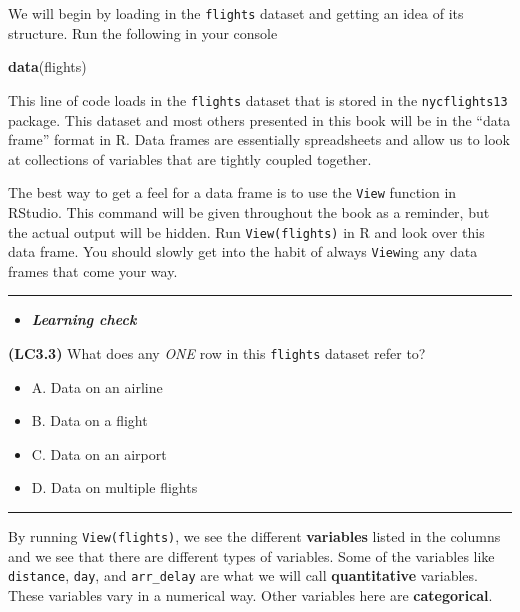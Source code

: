 \documentclass[]{tufte-book}
\newenvironment{Shaded}{\begin{snugshade}}{\end{snugshade}}
\newcommand{\KeywordTok}[1]{\textcolor[rgb]{0.13,0.29,0.53}{\textbf{{#1}}}}
\newcommand{\NormalTok}[1]{{#1}}
\let\oldrule=\rule
\renewcommand{\rule}[1]{\oldrule{\linewidth}}
\providecommand{\tightlist}{%
  \setlength{\itemsep}{0pt}\setlength{\parskip}{0pt}}
\newenvironment{rmdblock}[1]
  {\begin{shaded*}
  \begin{itemize}
  \renewcommand{\labelitemi}{
    \raisebox{-.7\height}[0pt][0pt]{
    }
  }
  \item
  }
  {
  \end{itemize}
  \end{shaded*}
  }
\newenvironment{learncheck}
  {\begin{rmdblock}{warning}}
  {\end{rmdblock}}
\begin{document}
We will begin by loading in the \texttt{flights} dataset and getting an
idea of its structure. Run the following in your console

\begin{Shaded}
\begin{Highlighting}[]
\KeywordTok{data}\NormalTok{(flights)}
\end{Highlighting}
\end{Shaded}

This line of code loads in the \texttt{flights} dataset that is stored
in the \texttt{nycflights13} package. This dataset and most others
presented in this book will be in the ``data frame'' format in R. Data
frames are essentially spreadsheets and allow us to look at collections
of variables that are tightly coupled together.

The best way to get a feel for a data frame is to use the \texttt{View}
function in RStudio. This command will be given throughout the book as a
reminder, but the actual output will be hidden. Run
\texttt{View(flights)} in R and look over this data frame. You should
slowly get into the habit of always \texttt{View}ing any data frames
that come your way.

\begin{center}\rule{0.5\linewidth}{\linethickness}\end{center}

\begin{learncheck}
\textbf{\emph{Learning check}}
\end{learncheck}

\textbf{(LC3.3)} What does any \emph{ONE} row in this \texttt{flights}
dataset refer to?

\begin{itemize}
\tightlist
\item
  A. Data on an airline
\item
  B. Data on a flight
\item
  C. Data on an airport
\item
  D. Data on multiple flights
\end{itemize}

\begin{center}\rule{0.5\linewidth}{\linethickness}\end{center}

By running \texttt{View(flights)}, we see the different
\textbf{variables} listed in the columns and we see that there are
different types of variables. Some of the variables like
\texttt{distance}, \texttt{day}, and \texttt{arr\_delay} are what we
will call \textbf{quantitative} variables. These variables vary in a
numerical way. Other variables here are \textbf{categorical}.
\end{document}
